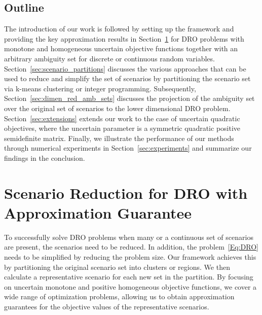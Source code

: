 \documentclass{article}
\begin{document}
\subsection{Outline}
The introduction of our work is followed by setting up the framework and providing the key approximation results in Section~\ref{sec:scenario_reduction} for DRO problems with monotone and homogeneous uncertain objective functions together with an arbitrary ambiguity set for discrete or continuous random variables.
Section~\ref{sec:scenario_partitions} discusses the various approaches that can be used to reduce and simplify the set of scenarios by partitioning the scenario set via k-means clustering or integer programming.
Subsequently, Section~\ref{sec:dimen_red_amb_sets} discusses the projection of the ambiguity set over the original set of scenarios to the lower dimensional DRO problem. %
Section~\ref{sec:extensions} extends our work to the case of uncertain quadratic objectives, where the uncertain parameter is a symmetric quadratic positive semidefinite matrix.
Finally, we illustrate the performance of our methods through
numerical experiments in Section~\ref{sec:experiments} and summarize
our findings in the conclusion.%

\section{Scenario Reduction for DRO with Approximation Guarantee}
\label{sec:scenario_reduction}



To successfully solve DRO problems when many or a continuous set of scenarios are present, the scenarios need to be reduced.
In addition, the problem~\eqref{Eq:DRO} needs to be simplified by reducing the problem size. %
Our framework achieves this by partitioning the original scenario set into clusters or regions.
We then calculate a representative scenario for each new set in the partition. 
By focusing on uncertain monotone and positive homogeneous objective functions, we cover a wide range of optimization problems, allowing us to obtain approximation guarantees for the objective values of the representative scenarios. %
\end{document}
